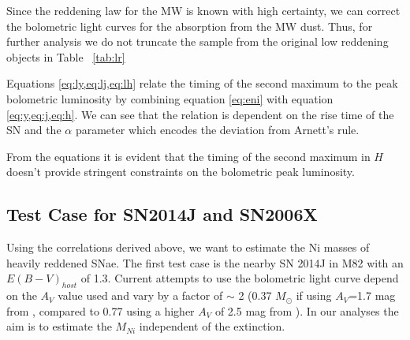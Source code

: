 Since the reddening law for the MW is known with high certainty, we can correct the bolometric light curves for the absorption from the MW dust. Thus, for further analysis we do not truncate the sample from the original low reddening objects in Table ~\ref{tab:lr}

\iffalse
Using equations \eqref{eq:lin_t2} we can derive a relation between the luminosity at peak and the $t_2$
\begin{subequations}
\begin{multline}
\label{eq:ly}
L_{max}=\alpha*[(1.79 (\pm 0.32) X 10^{42} e^{-t_R/8.8}  \\ + 4.04 (\pm 0.7) X 10^{41} e^{-t_R/111.3})* t_2(Y) \\ 
 - (1.41 (\pm 0.73) X 10^{43} e^{-t_R/8.8} + 3.06 (\pm 1.66) X 10^{42} e^{-t_R/111.3})]
\end{multline}
\begin{multline}
\label{eq:lj}
L_{max}=\alpha*[(1.73 (\pm 0.26) X 10^{42} e^{-t_R/8.8}  \\ + 3.93 (\pm 0.55) X 10^{41} e^{-t_R/111.3})* t_2(J) \\
- (1.32 (\pm 0.66) X 10^{43} e^{-t_R/8.8} + 3.01 (\pm 1.43) X 10^{42} e^{-t_R/111.3})]
\end{multline}
\begin{multline}
\label{eq:lh}
L_{max}=\alpha*[(1.03 (\pm 0.48) X 10^{42} e^{-t_R/8.8} \\ + 2.31 (\pm 1.04) X 10^{41} e^{-t_R/111.3})* t_2(H) \\
- (7.92 (\pm 9.65) X 10^{42} e^{-t_R/8.8} + 1.61 (\pm 2.31) X 10^{42} e^{-t_R/111.3})]
\end{multline}
\end{subequations}
\fi
Equations \eqref{eq:ly,eq:lj,eq:lh} relate the timing of the second maximum to the peak bolometric luminosity by combining equation \eqref{eq:eni} with equation \eqref{eq:y,eq:j,eq:h}. We can see that the relation is dependent on the rise time of the SN and the $\alpha$ parameter which encodes the deviation from Arnett's rule.

From the equations it is evident that the timing of the second maximum in $H$ doesn't provide stringent constraints on the bolometric peak luminosity.



\subsection{Test Case for SN2014J and SN2006X}
Using the correlations derived above, we want to estimate the Ni masses of heavily reddened SNae. The first test case is the nearby SN 2014J in M82 with an $E(B-V)_{host}$ of 1.3. 
Current attempts to use the bolometric light curve depend on the $A_V$ value used and vary by a factor of $\sim$ 2
 (0.37 $M_{\odot}$ if using $A_V$=1.7 mag from \citet{Margutti2014}, compared to 0.77 using a higher $A_V$ of 2.5 mag from \citet{Goobar2014}).  In our analyses the aim is to 
 estimate the $M_{Ni}$ independent of the extinction.

